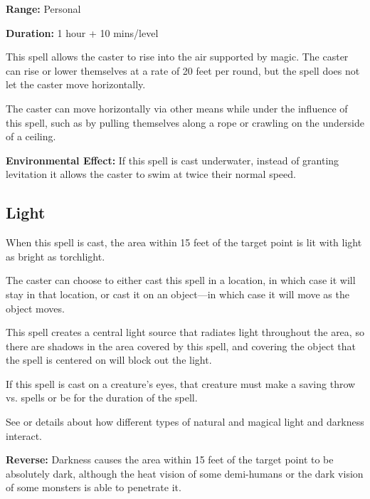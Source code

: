 \begin{multicols*}{2}
{\textbf{Range:} Personal

\textbf{Duration:} 1 hour + 10 mins/level}

This spell allows the caster to rise into the air supported by magic. The caster can rise or lower themselves at a rate of 20 feet per round, but the spell does not let the caster move horizontally.

The caster can move horizontally via other means while under the influence of this spell, such as by pulling themselves along a rope or crawling on the underside of a ceiling.

\textbf{Environmental Effect:} If this spell is cast underwater, instead of granting levitation it allows the caster to swim at twice their normal speed.

\subsection{Light}\label{spell:Light}

When this spell is cast, the area within 15 feet of the target point is lit with light as bright as torchlight.

The caster can choose to either cast this spell in a location, in which case it will stay in that location, or cast it on an object—in which case it will move as the object moves.

This spell creates a central light source that radiates light throughout the area, so there are shadows in the area covered by this spell, and covering the object that the spell is centered on will block out the light.

If this spell is cast on a creature’s eyes, that creature must make a saving throw vs. spells or be  for the duration of the spell.

See  or details about how different types of natural and magical light and darkness interact.

\textbf{Reverse:} \hypertarget{spell:Darkness}{Darkness} causes the area within 15 feet of the target point to be absolutely dark, although the heat vision of some demi-humans or the dark vision of some monsters is able to penetrate it.


\end{multicols*}
